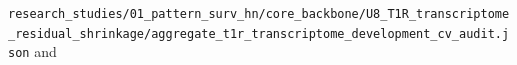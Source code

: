 \documentclass[pdflatex,sn-nature]{sn-jnl}
\begin{document}
{\footnotesize\texttt{r\allowbreak{}e\allowbreak{}s\allowbreak{}e\allowbreak{}a\allowbreak{}r\allowbreak{}c\allowbreak{}h\allowbreak{}\_\allowbreak{}s\allowbreak{}t\allowbreak{}u\allowbreak{}d\allowbreak{}i\allowbreak{}e\allowbreak{}s\allowbreak{}/\allowbreak{}0\allowbreak{}1\allowbreak{}\_\allowbreak{}p\allowbreak{}a\allowbreak{}t\allowbreak{}t\allowbreak{}e\allowbreak{}r\allowbreak{}n\allowbreak{}\_\allowbreak{}s\allowbreak{}u\allowbreak{}r\allowbreak{}v\allowbreak{}\_\allowbreak{}h\allowbreak{}n\allowbreak{}/\allowbreak{}c\allowbreak{}o\allowbreak{}r\allowbreak{}e\allowbreak{}\_\allowbreak{}b\allowbreak{}a\allowbreak{}c\allowbreak{}k\allowbreak{}b\allowbreak{}o\allowbreak{}n\allowbreak{}e\allowbreak{}/\allowbreak{}U\allowbreak{}8\allowbreak{}\_\allowbreak{}T\allowbreak{}1\allowbreak{}R\allowbreak{}\_\allowbreak{}t\allowbreak{}r\allowbreak{}a\allowbreak{}n\allowbreak{}s\allowbreak{}c\allowbreak{}r\allowbreak{}i\allowbreak{}p\allowbreak{}t\allowbreak{}o\allowbreak{}m\allowbreak{}e\allowbreak{}\_\allowbreak{}r\allowbreak{}e\allowbreak{}s\allowbreak{}i\allowbreak{}d\allowbreak{}u\allowbreak{}a\allowbreak{}l\allowbreak{}\_\allowbreak{}s\allowbreak{}h\allowbreak{}r\allowbreak{}i\allowbreak{}n\allowbreak{}k\allowbreak{}a\allowbreak{}g\allowbreak{}e\allowbreak{}/\allowbreak{}a\allowbreak{}g\allowbreak{}g\allowbreak{}r\allowbreak{}e\allowbreak{}g\allowbreak{}a\allowbreak{}t\allowbreak{}e\allowbreak{}\_\allowbreak{}t\allowbreak{}1\allowbreak{}r\allowbreak{}\_\allowbreak{}t\allowbreak{}r\allowbreak{}a\allowbreak{}n\allowbreak{}s\allowbreak{}c\allowbreak{}r\allowbreak{}i\allowbreak{}p\allowbreak{}t\allowbreak{}o\allowbreak{}m\allowbreak{}e\allowbreak{}\_\allowbreak{}d\allowbreak{}e\allowbreak{}v\allowbreak{}e\allowbreak{}l\allowbreak{}o\allowbreak{}p\allowbreak{}m\allowbreak{}e\allowbreak{}n\allowbreak{}t\allowbreak{}\_\allowbreak{}c\allowbreak{}v\allowbreak{}\_\allowbreak{}a\allowbreak{}u\allowbreak{}d\allowbreak{}i\allowbreak{}t\allowbreak{}.\allowbreak{}j\allowbreak{}s\allowbreak{}o\allowbreak{}n}} and 
\end{document}
